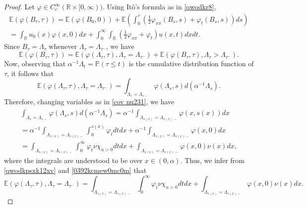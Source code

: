 \documentclass[10pt,a4paper]{amsart}
\def\E{{\mathbb{E}}}
\def\P{{\mathbb{P}}}
\def\R{{\mathbb{R}}}
\begin{document}
\begin{proof} Let $\varphi\in C_c^{\infty}(\R \times [0,\infty))$. Using It\^o's formula as in \eqref{qwodkr8},
\begin{multline}\label{qwodkr8u392qwxk12xv}
    \E(\varphi(B_{\tau},\tau))= \E(\varphi(B_0,0))+\E\left( \int_{0}^\tau \left(\frac{1}{2}\varphi_{xx}(B_s,s)+\varphi_t(B_s,s)\right)ds\right)
    \\=\int_{\R}u_0(x)\varphi(x,0)dx+ \int_{0}^{\infty}\int_{\R} \left( \frac{1}{2}\varphi_{xx}+\varphi_t\right)u(x,t)dxdt.\end{multline}
    Since $B_{\tau}=\Lambda_{\tau}$ whenever $\Lambda_{\tau}=\Lambda_{\tau^-}$, we have
\begin{equation}  \label{expcqwsum02s}\E(\varphi(B_{\tau},\tau))=\E(\varphi(\Lambda_{\tau},\tau), \Lambda_{\tau}=\Lambda_{\tau^-})+\E(\varphi(B_{\tau},\tau),\Lambda_{\tau}>\Lambda_{\tau^-}).\end{equation}
Now, observing that $\alpha^{-1}\Lambda_t=\P(\tau \leq t)$ is the cumulative distribution function of $\tau$, it follows that
    \begin{equation} \label{qwodkpsxk12xv}
        \E(\varphi(\Lambda_{\tau},\tau), \Lambda_{\tau}=\Lambda_{\tau^-})=\int_{\Lambda_s=\Lambda_{s-}}\varphi(\Lambda_s,s)d(\alpha^{-1}\Lambda_s).
    \end{equation}
Therefore, changing variables as in \eqref{cov nu231}, we have
     \begin{multline} \label{0392kcmew0mc0m}
         \int_{\Lambda_s=\Lambda_{s-}}\varphi(\Lambda_s,s)d(\alpha^{-1}\Lambda_s)
         =\alpha^{-1}\int_{{\Lambda_{s(x)}=\Lambda_{s(x)-}}}\varphi( x,s(x))dx\\=\alpha^{-1}\int_{\Lambda_{s(x)}=\Lambda_{s(x)-}}\int_{0}^{s(x)}\varphi_tdtdx+\alpha^{-1}\int_{\Lambda_{s(x)}=\Lambda_{s(x)-}}\varphi(x,0)dx\\=\int_{\Lambda_{s(x)}=\Lambda_{s(x)-}}\int_{0}^{\infty}\varphi_t\nu\chi_{u>0}dtdx+\int_{\Lambda_{s(x)}=\Lambda_{s(x)-}}\varphi(x,0)\nu(x)dx,
     \end{multline}
where the integrals are understood to be over $x\in (0,\alpha)$. Thus, we infer from \eqref{qwodkpsxk12xv} and \eqref{0392kcmew0mc0m} that
\begin{equation} \label{epx1dwlpas}
    \E(\varphi(\Lambda_{\tau},\tau), \Lambda_{\tau}=\Lambda_{\tau^-})=\int_{\Lambda_{s(x)}=\Lambda_{s(x)-}}\int_{0}^{\infty}\varphi_t\nu\chi_{u>0}dtdx+\int_{\Lambda_{s(x)}=\Lambda_{s(x)-}}\varphi(x,0)\nu(x)dx.
\end{equation}

\end{proof}
\end{document}
